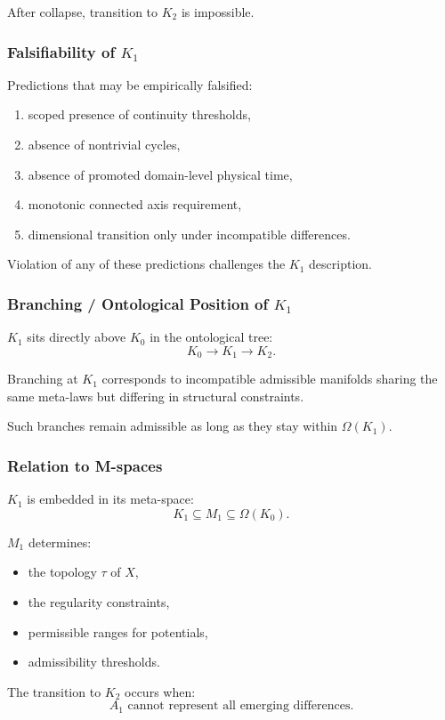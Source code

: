 After collapse, transition to $K_2$ is impossible.

\subsubsection{Falsifiability of \texorpdfstring{$K_1$}{K_1}}

Predictions that may be empirically falsified:
\begin{enumerate}
    \item scoped presence of continuity thresholds,
    \item absence of nontrivial cycles,
    \item absence of promoted domain-level physical time,
    \item monotonic connected axis requirement,
    \item dimensional transition only under incompatible differences.
\end{enumerate}

Violation of any of these predictions challenges the $K_1$ description.

\subsubsection{Branching / Ontological Position of \texorpdfstring{$K_1$}{K_1}}

$K_1$ sits directly above $K_0$ in the ontological tree:
\[
K_0 \to K_1 \to K_2.
\]

Branching at $K_1$ corresponds to incompatible admissible manifolds
sharing the same meta-laws but differing in structural constraints.

Such branches remain admissible as long as they stay within $\Omega(K_1)$.

\subsubsection{Relation to M-spaces}

$K_1$ is embedded in its meta-space:
\[
K_1 \subseteq M_1 \subseteq \Omega(K_0).
\]

$M_1$ determines:
\begin{itemize}
    \item the topology $\tau$ of $X$,
    \item the regularity constraints,
    \item permissible ranges for potentials,
    \item admissibility thresholds.
\end{itemize}

The transition to $K_2$ occurs when:
\[
A_1 \text{ cannot represent all emerging differences.}
\]
